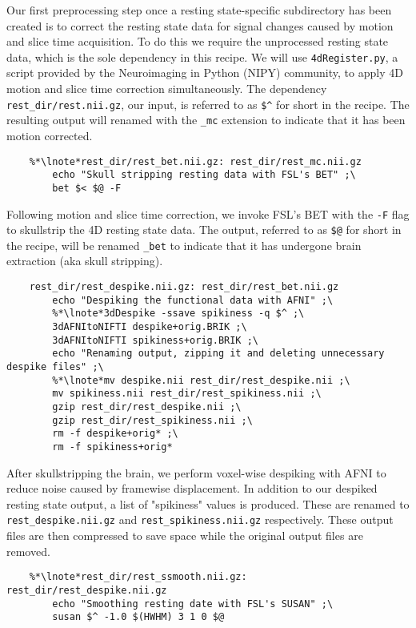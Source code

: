 Our first preprocessing step once a resting state-specific subdirectory has been created is to correct the resting state data for signal changes caused by motion and slice time acquisition. To do this we require the unprocessed resting state data, which is the sole dependency in this recipe.   We will use \texttt{4dRegister.py}, a script provided by the Neuroimaging in Python (NIPY) community, to apply 4D motion and slice time correction simultaneously. The dependency \texttt{rest_dir/rest.nii.gz}, our input, is referred to as \texttt{\$\^} for short in the recipe. The resulting output will renamed with the  \texttt{_mc} extension to indicate that it has been motion corrected.

\begin{lstlisting}
	%*\lnote*rest_dir/rest_bet.nii.gz: rest_dir/rest_mc.nii.gz
		echo "Skull stripping resting data with FSL's BET" ;\
		bet $< $@ -F
\end{lstlisting}

 Following motion and slice time correction, we invoke FSL's BET with the \texttt{-F} flag to skullstrip the 4D resting state data. The output, referred to as \texttt{\$@} for short in the recipe, will be renamed  \texttt{_bet} to indicate that it has undergone brain extraction (aka skull stripping).

\begin{lstlisting}
	rest_dir/rest_despike.nii.gz: rest_dir/rest_bet.nii.gz
		echo "Despiking the functional data with AFNI" ;\
		%*\lnote*3dDespike -ssave spikiness -q $^ ;\
		3dAFNItoNIFTI despike+orig.BRIK ;\
		3dAFNItoNIFTI spikiness+orig.BRIK ;\
		echo "Renaming output, zipping it and deleting unnecessary despike files" ;\
		%*\lnote*mv despike.nii rest_dir/rest_despike.nii ;\
		mv spikiness.nii rest_dir/rest_spikiness.nii ;\
		gzip rest_dir/rest_despike.nii ;\
		gzip rest_dir/rest_spikiness.nii ;\
		rm -f despike+orig* ;\
		rm -f spikiness+orig*
\end{lstlisting}

\lnum{8} After skullstripping the brain, we perform voxel-wise despiking with AFNI to reduce noise caused by framewise displacement.  In addition to our despiked resting state output, a list of "spikiness" values is produced. These are renamed to \texttt{rest_despike.nii.gz} and \texttt{rest_spikiness.nii.gz} respectively. These output files are then compressed to save space while the original output files are removed.

\begin{lstlisting}
	%*\lnote*rest_dir/rest_ssmooth.nii.gz: rest_dir/rest_despike.nii.gz
		echo "Smoothing resting date with FSL's SUSAN" ;\
		susan $^ -1.0 $(HWHM) 3 1 0 $@
\end{lstlisting}

